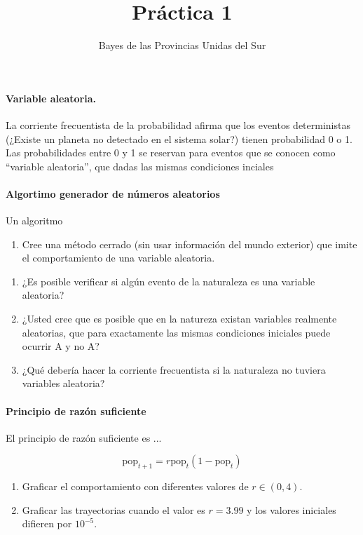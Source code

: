 \documentclass[a4paper,10pt]{article}
\title{Práctica 1}
\author{Bayes de las Provincias Unidas del Sur}
\begin{document}
\maketitle

\tableofcontents

\paragraph{Variable aleatoria.} La corriente frecuentista de la probabilidad afirma que los eventos deterministas (¿Existe un planeta no detectado en el sistema solar?) tienen probabilidad 0 o 1.
Las probabilidades entre 0 y 1 se reservan para eventos que se conocen como ``variable aleatoria'', que dadas las mismas condiciones inciales


\paragraph{Algortimo generador de números aleatorios} Un algoritmo

\begin{enumerate}[resume]
\item Cree una método cerrado (sin usar información del mundo exterior) que imite el comportamiento de una variable aleatoria.
\end{enumerate}



\begin{enumerate}[resume]
\item ¿Es posible verificar si algún evento de la naturaleza es una variable aleatoria?
\item ¿Usted cree que es posible que en la natureza existan variables realmente aleatorias, que para exactamente las mismas condiciones iniciales puede ocurrir A y no A?
\item ¿Qué debería hacer la corriente frecuentista si la naturaleza no tuviera variables aleatoria?
\end{enumerate}

\paragraph{Principio de razón suficiente} El principio de razón suficiente es ...

\begin{equation}
\text{pop}_{t+1} = r \text{pop}_t (1-\text{pop}_t)
\end{equation}

\begin{enumerate}[resume]
\item Graficar el comportamiento con diferentes valores de $r \in (0,4)$.
\item Graficar las trayectorias cuando el valor es $r=3.99$ y los valores iniciales difieren por $10^{-5}$.
\end{enumerate}
\end{document}
